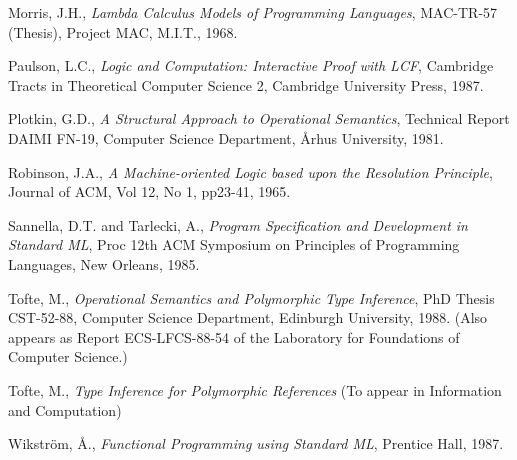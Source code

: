 \begin{thebibliography}{99}
 Morris, J.H., {\em Lambda Calculus Models of Programming Languages},
MAC-TR-57 (Thesis), Project MAC, M.I.T., 1968.

 Paulson, L.C., {\em Logic and Computation: Interactive Proof with
LCF}, Cambridge Tracts in Theoretical Computer Science 2, Cambridge University
Press, 1987.

 Plotkin, G.D., {\em A Structural Approach to Operational Semantics},
Technical Report DAIMI FN-19, Computer Science Department, \AA rhus University,
1981.

 Robinson, J.A., {\em A Machine-oriented Logic based upon the
Resolution Principle}, Journal of ACM, Vol 12, No 1, pp23-41, 1965. 

 Sannella, D.T. and Tarlecki, A., {\em Program Specification
and Development in Standard ML}, 
Proc 12th ACM Symposium on Principles of
Programming Languages, New Orleans, 1985.

 Tofte, M., {\em Operational Semantics and Polymorphic Type
Inference}, PhD Thesis CST-52-88, 
Computer Science Department, Edinburgh University, 1988. (Also appears as
Report ECS-LFCS-88-54 of the Laboratory for Foundations of Computer Science.)

 Tofte, M., {\em Type Inference for Polymorphic References}
(To appear in Information and Computation)

 Wikstr\"{o}m, \AA., {\em Functional Programming using Standard
ML}, Prentice Hall, 1987.
\end{thebibliography}




